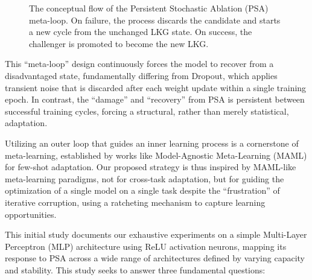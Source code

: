 \documentclass[conference]{IEEEtran}
\begin{document}
\begin{figure}[h!]
\centering
{}
\caption{The conceptual flow of the Persistent Stochastic Ablation (PSA) meta-loop. On failure, the process discards the candidate and starts a new cycle from the unchanged LKG state. On success, the challenger is promoted to become the new LKG.}
\label{fig:psa-flow-vertical}
\end{figure}

This ``meta-loop'' design continuously forces the model to recover from a disadvantaged state, fundamentally differing from Dropout, which applies transient noise that is discarded after each weight update within a single training epoch. In contrast, the ``damage'' and ``recovery'' from PSA is persistent between successful training cycles, forcing a structural, rather than merely statistical, adaptation.

Utilizing an outer loop that guides an inner learning process is a cornerstone of meta-learning, established by works like Model-Agnostic Meta-Learning (MAML) \cite{b6} for few-shot adaptation. Our proposed strategy is thus inspired by MAML-like meta-learning paradigms, not for cross-task adaptation, but for guiding the optimization of a single model on a single task despite the ``frustration'' of iterative corruption, using a ratcheting mechanism to capture learning opportunities.

This initial study documents our exhaustive experiments on a simple Multi-Layer Perceptron (MLP) architecture using ReLU activation neurons, mapping its response to PSA across a wide range of architectures defined by varying capacity and stability. This study seeks to answer three fundamental questions:
\end{document}
